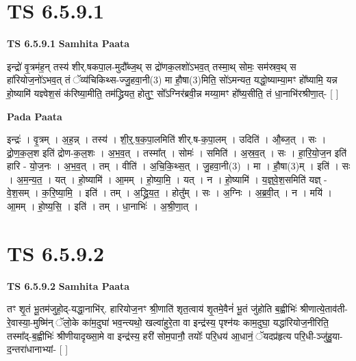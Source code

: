 \documentclass[17pt]{extarticle}
\begin{document}

\section{ TS 6.5.9.1 }

\textbf{TS 6.5.9.1 } \newline
\textbf{Samhita Paata} \newline

इन्द्रो॑ वृ॒त्रम॑ह॒न् तस्य॑ शीर्.षकपा॒ल-मुदौ᳚ब्ज॒थ् स द्रो॑णक॒लशो॑ऽभव॒त् तस्मा॒थ् सोमः॒ सम॑स्रव॒थ् स हा॑रियोज॒नो॑ऽभव॒त् तं ॅव्य॑चिकिथ्स-ज्जु॒हवा॒नी(3) मा हौ॒षा(3)मिति॒ सो॑ऽमन्यत॒ यद्धो॒ष्याम्या॒मꣳ हो᳚ष्यामि॒ यन्न हो॒ष्यामि॑ यज्ञ्वेश॒सं क॑रिष्या॒मीति॒ तम॑द्ध्रियत॒ होतुꣳ॒॒ सो᳚ऽग्निर॑ब्रवी॒न्न मय्या॒मꣳ हो᳚ष्य॒सीति॒ तं धा॒नाभि॑रश्रीणा॒त्- [  ] \newline

\textbf{Pada Paata} \newline

इन्द्रः॑ । वृ॒त्रम् । अ॒ह॒न्न् । तस्य॑ । शी॒र्॒.ष॒क॒पा॒लमिति॑ शीर्.ष-क॒पा॒लम् । उदिति॑ । औ॒ब्ज॒त् । सः । द्रो॒ण॒क॒ल॒श इति॑ द्रोण-क॒ल॒शः । अ॒भ॒व॒त् । तस्मा᳚त् । सोमः॑ । समिति॑ । अ॒स्र॒व॒त् । सः । हा॒रि॒यो॒ज॒न इति॑ हारि - यो॒ज॒नः । अ॒भ॒व॒त् । तम् । वीति॑ । अ॒चि॒कि॒थ्स॒त् । जु॒हवा॒नी(3) । मा । हौ॒षा(3)म् । इति॑ । सः । अ॒म॒न्य॒त॒ । यत् । हो॒ष्यामि॑ । आ॒मम् । हो॒ष्या॒मि॒ । यत् । न । हो॒ष्यामि॑ । य॒ज्ञ्॒वे॒श॒समिति॑ यज्ञ् - वे॒श॒सम् । क॒रि॒ष्या॒मि॒ । इति॑ । तम् । अ॒द्ध्रि॒य॒त॒ । होतु᳚म् । सः । अ॒ग्निः । अ॒ब्र॒वी॒त् । न । मयि॑ । आ॒मम् । हो॒ष्य॒सि॒ । इति॑ । तम् । धा॒नाभिः॑ । अ॒श्री॒णा॒त् ।  \newline





\section{ TS 6.5.9.2 }

\textbf{TS 6.5.9.2 } \newline
\textbf{Samhita Paata} \newline

तꣳ शृ॒तं भू॒तम॑जुहो॒द्-यद्धा॒नाभि॑र्. हारियोज॒नꣳ श्री॒णाति॑ शृत॒त्वाय॑ शृ॒तमे॒वैनं॑ भू॒तं जु॑होति ब॒ह्वीभिः॑ श्रीणात्ये॒ताव॑ती-रे॒वास्या॒-मुष्मि॑न् ॅलो॒के का॑म॒दुघा॑ भव॒न्त्यथो॒ खल्वा॑हुरे॒ता वा इन्द्र॑स्य॒ पृश्न॑यः काम॒दुघा॒ यद्धा॑रियोज॒नीरिति॒ तस्मा᳚द्-ब॒ह्वीभिः॑ श्रीणीयादृख्सा॒मे वा इन्द्र॑स्य॒ हरी॑ सोम॒पानौ॒ तयोः᳚ परि॒धय॑ आ॒धानं॒ ॅयदप्र॑हृत्य परि॒धी-ञ्जु॑हु॒या-द॒न्तरा॑धानाभ्यां- [  ] \newline
\end{document}
